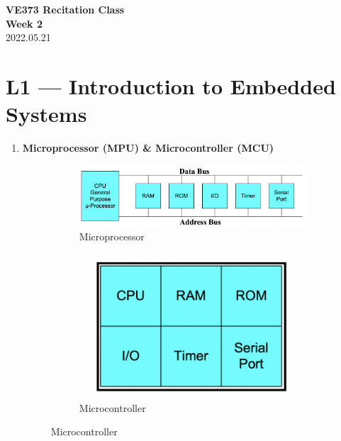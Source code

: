 \documentclass[a4paper]{article}
\begin{document}
\renewcommand{\thesection}{\Roman{section}}
\renewcommand{\thesubsection}{\Alph{subsection}}
\renewcommand{\thesubsubsection}{\thesubsection.\arabic{subsubsection}}
\renewcommand{\d}{\: \mathrm{d} }
\newcommand{\e}{\mathrm{e}}

\begin{center}
  \textbf{\Large VE373 Recitation Class}\\[1em]
  \textbf{\large Week 2} \\[1em]
  2022.05.21 \\[1em]
\end{center}

\section*{L1 --- Introduction to Embedded Systems}
  \begin{enumerate}[label = \arabic*.]
    \item \textbf{Microprocessor (MPU) \& Microcontroller (MCU)}
      \begin{figure}[H]
        \centering
        \begin{subfigure}[b]{0.65\linewidth}
          \centering
          \includegraphics[width=0.9\linewidth]{MPU.png}
          \caption{Microprocessor}
          \label{subfig:MPU.png}
        \end{subfigure}
        \begin{subfigure}[b]{0.3\linewidth}
          \centering
          \includegraphics[width=0.9\linewidth]{MCU.png}
          \caption{Microcontroller}
          \label{subfig:MCU.png}
        \end{subfigure}
      \end{figure}


\end{enumerate}
\end{document}
